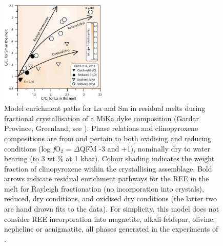 \documentclass[final,authoryear,3p,times,twocolumn]{elsarticle}
\newcommand{\fO}{\textit{f}O$_{2}$ }
\begin{document}
 \begin{figure}[bt]
        \begin{center}
        \includegraphics[width=0.45\textwidth]{15_FractCryst_Giehl_NoContours.eps}
        \caption[La vs. Sm diagram showing the geochemical evolution of the MiKa dyke, Gardar province, Greenland]    
        {Model enrichment paths for La and Sm in residual melts during fractional crystallisation of a MiKa dyke composition (Gardar Province, Greenland, see \citealt{Marks2003}). Phase relations and clinopyroxene compositions are from \citet{Giehl2013} and pertain to both oxidising and reducing conditions (log \fO = $\Delta$QFM -3 and +1), nominally dry to water bearing (to 3 wt.\%  at 1 kbar). Colour shading indicates the weight fraction of clinopyroxene within the crystallising assemblage. Bold arrows indicate residual enrichment pathways for the REE in the melt for Rayleigh fractionation (no incorporation into crystals), reduced, dry conditions, and oxidised dry conditions (the latter two are hand drawn fits to the data). For simplicity, this model does not consider REE incorporation into magnetite, alkali-feldspar, olivine, nepheline or aenigmatite, all phases generated in the experiments of \citet{Giehl2013} \citep[see][]{Larsen1979,Kovalenko1988,Mahood1990}.}
        \label{15_Fract_Cryst}
        \end{center}
        \end{figure}
\end{document}
